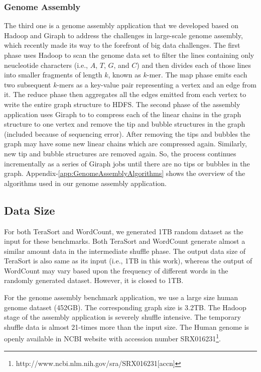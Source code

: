 \documentclass[journal]{IEEEtran}
\begin{document}
\subsubsection{Genome Assembly}
The third one is a genome assembly application that we developed based on Hadoop and Giraph to address the challenges in large-scale genome assembly, which recently made its way to the forefront of big data challenges. The first phase uses Hadoop to scan the genome data set to filter the lines containing only neucleotide characters (i.e., $A$, $T$, $G$, and $C$) and then divides each of those lines into smaller fragments of length $k$, known as $k$-mer. The map phase emits each two subsequent $k$-mers as a key-value pair representing a vertex and an edge from it. The reduce phase then aggregates all the edges emitted from each vertex to write the entire graph structure to HDFS. The second phase of the assembly application uses Giraph to to compress each of the linear chains in the graph structure to one vertex and remove the tip and bubble structures in the graph (included because of sequencing error). After removing the tips and bubbles the graph may have some new linear chains which are compressed again. Similarly, new tip and bubble structures are removed again. So, the process continues incrementally as a series of Giraph jobs until there are no tips or bubbles in the graph. Appendix-\ref{app:GenomeAssemblyAlgorithms} shows the overview of the algorithms used in our genome assembly application.

\subsection{Data Size}
For both TeraSort and WordCount, we generated 1TB random dataset as the input for these benchmarks. Both TeraSort and WordCount generate almost a similar amount data in the intermediate shuffle phase. The output data size of TeraSort is also same as its input (i.e., 1TB in this work), whereas the output of WordCount may vary based upon the frequency of different words in the randomly generated dataset. However, it is closed to 1TB.

For the genome assembly benchmark application, we use a large size human genome dataset (452GB). The corresponding graph size is 3.2TB. The Hadoop stage of the assembly application is severely shuffle intensive. The temporary shuffle data is almost 21-times more than the input size. The Human genome is openly available in NCBI website with accession number SRX016231\footnote{http://www.ncbi.nlm.nih.gov/sra/SRX016231[accn]}.
\end{document}
